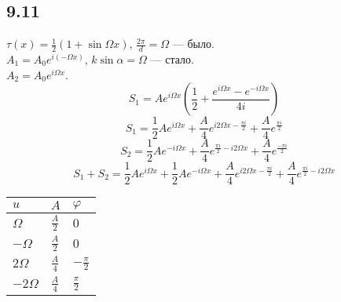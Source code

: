 \subsection*{9.11}
$\tau (x) = \frac{1}{2} (1+ \sin \Omega x)$, $\frac{2\pi}{d} = \Omega$ --- было.\\
$A_1 = A_0 e^{i(-\Omega x)}$, $k\sin \alpha = \Omega$ --- стало.\\
$A_2 = A_0 e^{i\Omega x}$.\\
\begin{equation*}
	S_1 = A e^{i\Omega x} (\frac{1}{2} + \frac{ e^{i\Omega x} -  e^{-i\Omega x} }{4i}) 
\end{equation*}
\begin{equation*}
	S_1 =  \frac{1}{2} A e^{i\Omega x} + \frac{A}{4} e^{i2\Omega x - \frac{\pi i}{2}} + \frac{A}{4} e^{\frac{\pi i}{2}}
\end{equation*}
\begin{equation*}
	S_2=  \frac{1}{2} A e^{-i\Omega x} + \frac{A}{4} e^{ \frac{\pi i}{2} - i2\Omega x} + \frac{A}{4} e^{\frac{-\pi i}{2}}
\end{equation*}
\begin{equation*}
	S_1 + S_2 = \frac{1}{2} A e^{i\Omega x} +  \frac{1}{2} A e^{-i\Omega x} + \frac{A}{4} e^{i2\Omega x - \frac{\pi i}{2}} +  \frac{A}{4} e^{ \frac{\pi i}{2} - i2\Omega x} 
\end{equation*}
\begin{table}[H]
	\begin{tabular}{|l|l|l|}
		\hline
		$u$        & $A$           & $\varphi$        \\ \hline
		$\Omega$   & $\frac{A}{2}$ & $0$              \\ \hline
		$-\Omega$ & $\frac{A}{2}$ & $0$              \\ \hline
		$2\Omega$  & $\frac{A}{4}$ & $-\frac{\pi}{2}$ \\ \hline
		$-2\Omega$ & $\frac{A}{4}$ & $\frac{\pi}{2}$  \\ \hline
	\end{tabular}
\end{table}
